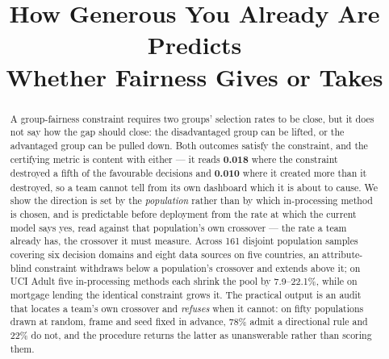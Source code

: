 \documentclass[9pt,conference]{IEEEtran}
\begin{document}
\title{How Generous You Already Are Predicts\\
Whether Fairness Gives or Takes}

\author{
}

\maketitle

\begin{abstract}
A group-fairness constraint requires two groups' selection rates to be close, but it does not
say how the gap should close: the disadvantaged group can be lifted, or the advantaged group
can be pulled down. Both outcomes satisfy the constraint, and the certifying metric is
content with either --- it reads \textbf{0.018} where the constraint destroyed a fifth of
the favourable decisions and \textbf{0.010} where it created more than it destroyed, so a
team cannot tell from its own dashboard which it is about to cause. We show the direction is set by the \emph{population} rather than by which in-processing
method is chosen, and is predictable before deployment from the rate at which the current
model says yes, read against that population's own crossover --- the rate a team already has,
the crossover it must measure. Across 161 disjoint population samples covering six decision domains
and eight data sources on five countries, an attribute-blind constraint withdraws below a
population's crossover and extends above it; on UCI Adult five in-processing methods each shrink the pool by
7.9--22.1\%, while on mortgage lending the identical constraint grows it. The practical output is an
audit that locates a team's own crossover and \emph{refuses} when it cannot: on fifty
populations drawn at random, frame and seed fixed in advance, 78\% admit a directional rule
and 22\% do not, and the procedure returns the latter as unanswerable rather than scoring
them.


\end{abstract}
\end{document}
